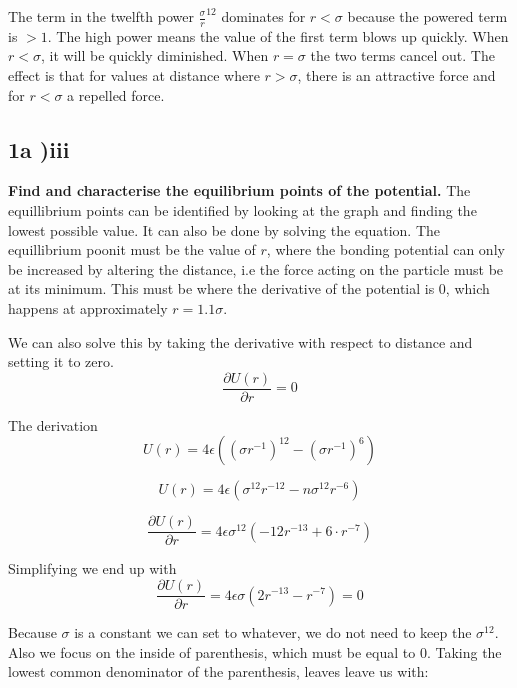 \documentclass[a4paper,10pt,english]{article}
\begin{document}
The term in the twelfth power $\frac{\sigma}{r}^12$ dominates for $r < \sigma$ because the powered term is $ > 1$. The high power means the value of the first term blows up quickly. When $r < \sigma$, it will be quickly diminished. When $r = \sigma$ the two terms cancel out. The effect is that for values at distance where $r > \sigma$, there is an attractive force and for $r < \sigma$ a repelled force.

\subsection*{1a )iii}
\textbf{Find and characterise the equilibrium points of the potential.
}
The equillibrium points can be identified by looking at the graph and finding the lowest possible value. It can also be done by solving the equation.  The equillibrium poonit must be the value of $r$, where the bonding potential can only be increased by altering the distance, i.e the force acting on the particle must be at its minimum. This must be where the derivative of the potential is 0, which happens at approximately $r = 1.1\sigma$. 

We can also solve this by taking the derivative with respect to distance and setting it to zero.
\begin{equation}
\frac{\partial U(r)}{\partial r} = 0
\end{equation}

The derivation 
\begin{equation}
U(r) = 
4\epsilon \left(   (\sigma r^{-1})^{12} -   (\sigma r^{-1})^6 \right)  
\end{equation}

\begin{equation}
U(r) = 
4\epsilon \left(   \sigma^{12} r^{-12} -  n \sigma^{12} r^{-6} \right) 
\end{equation}


\begin{equation}
\frac{\partial U(r)}{\partial r} = 
4\epsilon \sigma^{12} \left(   -12  r^{-13} + 6 \cdot   r^{-7} \right)
\end{equation}

Simplifying we end up with
\begin{equation}
\frac{\partial U(r)}{\partial r} = 
4\epsilon \sigma \left( 2  r^{-13} -   r^{-7} \right) = 0
\end{equation}

Because $\sigma$ is a constant we can set to whatever,  we do not need to keep the $\sigma^{12}$. Also we focus on the inside of parenthesis, which must be equal to 0. Taking the lowest common denominator of the parenthesis, leaves leave us with:
\end{document}
